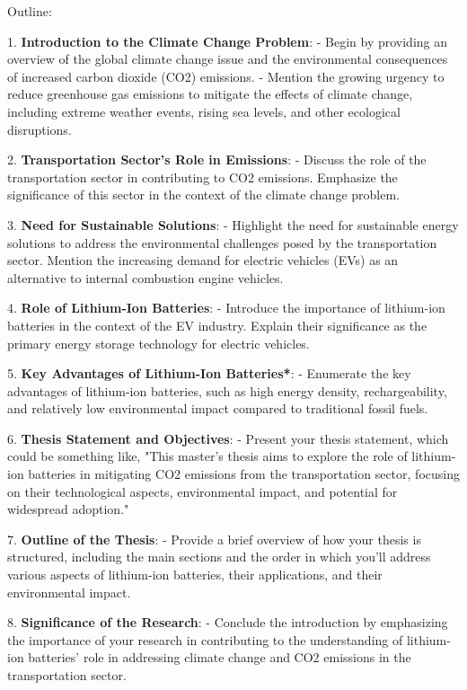 Outline:

1. \textbf{Introduction to the Climate Change Problem}:
   - Begin by providing an overview of the global climate change issue and the environmental consequences of increased carbon dioxide (CO2) emissions.
   - Mention the growing urgency to reduce greenhouse gas emissions to mitigate the effects of climate change, including extreme weather events, rising sea levels, and other ecological disruptions.

2. \textbf{Transportation Sector's Role in Emissions}:
   - Discuss the role of the transportation sector in contributing to CO2 emissions. Emphasize the significance of this sector in the context of the climate change problem.

3. \textbf{Need for Sustainable Solutions}:
   - Highlight the need for sustainable energy solutions to address the environmental challenges posed by the transportation sector. Mention the increasing demand for electric vehicles (EVs) as an alternative to internal combustion engine vehicles.

4. \textbf{Role of Lithium-Ion Batteries}:
   - Introduce the importance of lithium-ion batteries in the context of the EV industry. Explain their significance as the primary energy storage technology for electric vehicles.

5. \textbf{Key Advantages of Lithium-Ion Batteries*}:
   - Enumerate the key advantages of lithium-ion batteries, such as high energy density, rechargeability, and relatively low environmental impact compared to traditional fossil fuels.

6. \textbf{Thesis Statement and Objectives}:
   - Present your thesis statement, which could be something like, "This master's thesis aims to explore the role of lithium-ion batteries in mitigating CO2 emissions from the transportation sector, focusing on their technological aspects, environmental impact, and potential for widespread adoption."

7. \textbf{Outline of the Thesis}:
   - Provide a brief overview of how your thesis is structured, including the main sections and the order in which you'll address various aspects of lithium-ion batteries, their applications, and their environmental impact.

8. \textbf{Significance of the Research}:
   - Conclude the introduction by emphasizing the importance of your research in contributing to the understanding of lithium-ion batteries' role in addressing climate change and CO2 emissions in the transportation sector.

